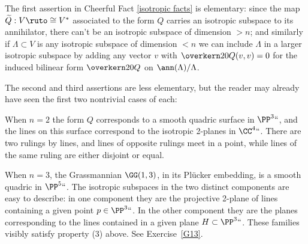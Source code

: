 \begin{remark}
The first assertion in
Cheerful Fact \ref{isotropic facts}
is
elementary: since the map
$\widetilde Q : V \ruto \cong V^*$ associated to the form $Q$ carries
%
an isotropic subspace to its annihilator, there can't be an isotropic
subspace of dimension $>n$; and similarly if $\Lambda \subset V$ is any
isotropic subspace of dimension $<n$ we can include $\Lambda$ in a larger
isotropic subspace by adding any vector $v$ with $\overkern20 Q(v,v) = 0$
for the induced bilinear form $\overkern20 Q$ on $\ann(\Lambda)/\Lambda$.

The second and third assertions are less elementary, but the reader may
already have seen the first two nontrivial cases of each:
\end{remark}

\begin{example}
When $n=2$ the form $Q$ corresponds to a smooth quadric surface
in $\PP^3` `$, and the lines on this surface correspond to the isotropic
2-planes in $\CC^4` `$. There are two rulings by lines, and lines of
opposite rulings meet in a point, while lines of the same ruling are
either disjoint or equal.
\end{example}

\begin{example}
When $n=3$, the Grassmannian $\GG(1,3)$, in its
Pl\"ucker embedding,
%
%
%
is a smooth quadric in $\PP^5` `$. The isotropic subspaces in the two distinct
components are easy to describe: in one component they are the projective
2-plane of lines containing a given point $p \in \PP^3` `$. In the other
component they are  the planes corresponding to the lines contained in a
given plane $H \subset \PP^3` `$. These families visibly satisfy property (3) above.
See Exercise~\ref{G13}.
\end{example}


